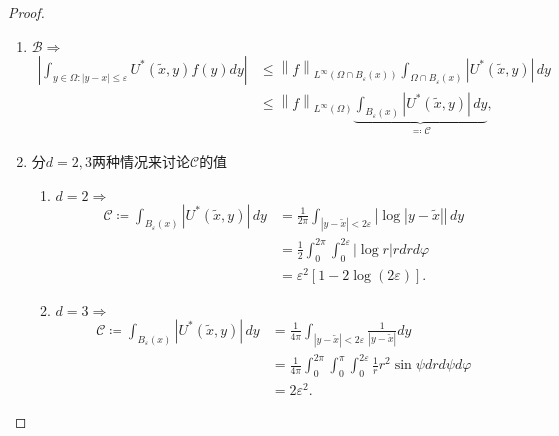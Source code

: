 \begin{proof}
\begin{enumerate}
\item $\mathcal{B} \Rightarrow$
\begin{equation*}
  \begin{split}
    \left|
    \int_{y \in \Omega: |y - x| \le \varepsilon}
    U^{*}(\widetilde{x}, y) f(y) dy
    \right| & \le
    \left\| f \right\|_{L^{\infty} (\Omega \cap B_{\varepsilon}(x))}
    \int_{\Omega \cap B_{\varepsilon}(x)} \left| U^{*}(\widetilde{x}, y) \right| \, dy \\
    & \le \left\| f \right\|_{L^{\infty}(\Omega)}
    \underbrace{
    \int_{B_{\varepsilon}(x)} \left| U^{*}(\widetilde{x}, y) \right| \, dy
    }_{\eqqcolon \mathcal{C}},
  \end{split}
\end{equation*}
\item 分$d=2,3$两种情况来讨论$\mathcal{C}$的值
\begin{enumerate}
  \item $d=2 \Rightarrow$
  \begin{equation}
    \label{eq:mathcalC-d2-varepsilon}
    \begin{split}
      \mathcal{C} \coloneqq \int_{B_{\varepsilon}(x)} \left| U^{*}(\widetilde{x}, y) \right| \, dy & =
      \frac{1}{2 \pi} \int_{\left| y - \widetilde{x} \right| < 2 \varepsilon}
      \left| \log \left| y - \widetilde{x} \right| \right| \, dy\\
      & = \frac{1}{2}
      \int_{0}^{2 \pi}
      \int_{0}^{2 \varepsilon}
      \left|
      \log r
      \right|
      r
      dr d \varphi \\
      & = \varepsilon^2 \left[ 1 - 2 \log \left(2 \varepsilon \right) \right].
    \end{split}
  \end{equation}
  \item $d = 3 \Rightarrow$
  \begin{equation}
    \label{eq:mathcalC-d3-varepsilon}
    \begin{split}
      \mathcal{C} \coloneqq \int_{B_{\varepsilon}(x)} \left| U^{*}(\widetilde{x}, y) \right| \, dy & = \frac{1}{4 \pi}
      \int_{\left| y - \widetilde{x} \right| < 2 \varepsilon}
      \frac{1}{\left| y - \widetilde{x} \right|} dy \\
      & = \frac{1}{4 \pi}
      \int_{0}^{2 \pi}
      \int_{0}^{\pi}
      \int_{0}^{2 \varepsilon}
      \frac{1}{r}
      r^2
      \sin \psi
      dr d \psi d \varphi \\
      & = 2 \varepsilon^2.
    \end{split}
  \end{equation}
\end{enumerate}
\end{enumerate}


\end{proof}
